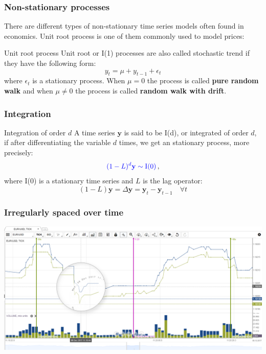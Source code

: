 \documentclass{beamer}
\begin{document}
\begin{frame}
\frametitle{Non-stationary processes}
There are different types of non-stationary time series models often found in economics. Unit root process is one of them commonly used to model prices:
\begin{block}{Unit root process}
{\color{red}Unit root or I(1)} processes are also called stochastic trend if they have the following form:
{\color{blue}
\[
y_t = \mu + y_{t-1} + \epsilon_t
\]}
\noindent where $\epsilon_t$ is a stationary process. When $\mu = 0 $ the process is called {\bf pure random walk} and when $\mu \neq 0$  the process is called {\bf random walk with drift}.
\end{block}
\end{frame}


\begin{frame}
\frametitle{Integration }
\begin{block}{Integration of order $d$}
A time series $\mathbf{y}$ is said to be I(d), or integrated of order $d$, if after
differentiating the variable $d$ times, we get an stationary process, more precisely:
\[
{\color{blue}
(1-L)^d \mathbf{y} \sim \text{I(0)}} \, ,
\]
\noindent where I(0) is a stationary time series and $L$ is the lag operator:
\[
(1-L)\mathbf{y} = \Delta \mathbf{y}=\mathbf{y}_t  -\mathbf{y}_{t-1} \quad \forall t
\]
\end{block}
\end{frame}

\begin{frame}
\frametitle{Irregularly spaced over time}
\centerline{
\includegraphics[width=\paperwidth,height=0.7\paperheight]{img/hft-ticks-zoom.png}
}
\end{frame}
%
\end{document}

